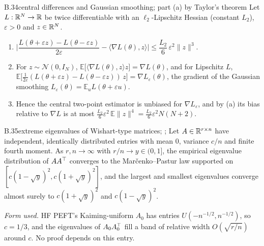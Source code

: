 \begin{auxresult}{B.34}{central differences and Gaussian smoothing}{\citep{xnesterov2017random}; part (a) by Taylor's
theorem}
Let $L:\mathbb{R}^N\to\mathbb{R}$ be twice differentiable with an $\ell_2$-Lipschitz Hessian (constant $L_2$), $\varepsilon>0$ and
$z\in\mathbb{R}^N$.
\begin{enumerate}[label=(\alph*)]
  \item $\Big\lvert\dfrac{L(\theta+\varepsilon z)-L(\theta-\varepsilon z)}{2\varepsilon}-\langle\nabla L(\theta),z\rangle
    \Big\rvert\le\dfrac{L_2}{6}\,\varepsilon^2\lVert z\rVert^3$.
  \item For $z\sim\mathcal N(0,I_N)$, $\mathbb E\big[\langle\nabla L(\theta),z\rangle z\big]=\nabla L(\theta)$, and for
    Lipschitz $L$, $\mathbb E\big[\tfrac{1}{2\varepsilon}(L(\theta+\varepsilon z)-L(\theta-\varepsilon z))\,z\big]=\nabla
    L_\varepsilon(\theta)$, the gradient of the Gaussian smoothing $L_\varepsilon(\theta)=\mathbb E_uL(\theta+\varepsilon
    u)$.
  \item Hence the central two-point estimator is unbiased for $\nabla L_\varepsilon$, and by (a) its bias relative to
    $\nabla L$ is at most $\tfrac{L_2}{6}\varepsilon^2\,\mathbb E\lVert z\rVert^4=\tfrac{L_2}{6}\varepsilon^2N(N+2)$.
\end{enumerate}
\end{auxresult}

\begin{auxresult}{B.35}{extreme eigenvalues of Wishart-type matrices}{\citep{xmarchenko1967distribution};
\citep{xyin1988limit}; \citep{xbai1993limit}}
Let $A\in\mathbb{R}^{r\times n}$ have independent, identically distributed entries with mean $0$, variance $c/n$ and finite
fourth moment. As $r,n\to\infty$ with $r/n\to y\in(0,1]$, the empirical eigenvalue
distribution of $AA^{\top}$ converges to the Marčenko--Pastur law supported on $[c(1-\sqrt y)^2,c(1+\sqrt y)^2]$, and the
largest and smallest eigenvalues converge almost surely to $c(1+\sqrt y)^2$ and $c(1-\sqrt y)^2$.
\end{auxresult}
\noindent\emph{Form used.} HF PEFT's Kaiming-uniform $A_0$ has entries $U(-n^{-1/2},n^{-1/2})$, so $c=1/3$, and the
eigenvalues of $A_0A_0^{\top}$ fill a band of relative width $O(\sqrt{r/n})$ around $c$. No proof depends on this entry.

